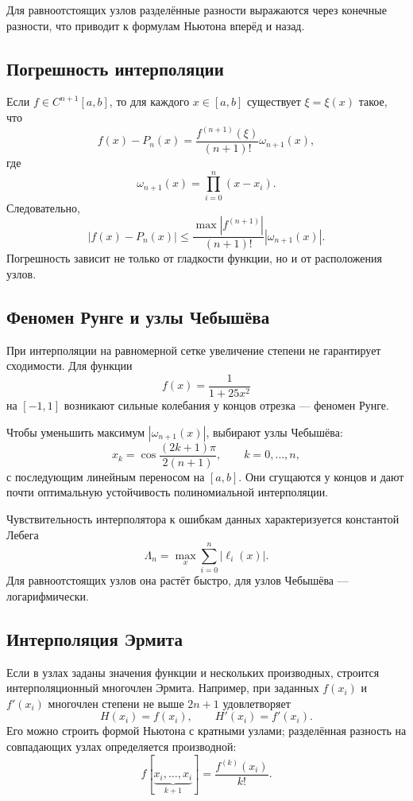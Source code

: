 Для равноотстоящих узлов разделённые разности выражаются через конечные разности,
что приводит к формулам Ньютона вперёд и назад.

\subsection{Погрешность интерполяции}

Если $f\in C^{n+1}[a,b]$, то для каждого $x\in[a,b]$ существует
$\xi=\xi(x)$ такое, что
\[
    f(x)-P_n(x)=
    \frac{f^{(n+1)}(\xi)}{(n+1)!}
    \omega_{n+1}(x),
\]
где
\[
    \omega_{n+1}(x)=\prod_{i=0}^{n}(x-x_i).
\]
Следовательно,
\[
    |f(x)-P_n(x)|
    \leq
    \frac{\max|f^{(n+1)}|}{(n+1)!}
    |\omega_{n+1}(x)|.
\]
Погрешность зависит не только от гладкости функции, но и от расположения узлов.

\subsection{Феномен Рунге и узлы Чебышёва}

При интерполяции на равномерной сетке увеличение степени не гарантирует
сходимости. Для функции
\[
    f(x)=\frac{1}{1+25x^2}
\]
на $[-1,1]$ возникают сильные колебания у концов отрезка --- феномен Рунге.

Чтобы уменьшить максимум $|\omega_{n+1}(x)|$, выбирают узлы Чебышёва:
\[
    x_k=\cos\frac{(2k+1)\pi}{2(n+1)},
    \qquad k=0,\ldots,n,
\]
с последующим линейным переносом на $[a,b]$. Они сгущаются у концов и дают почти
оптимальную устойчивость полиномиальной интерполяции.

Чувствительность интерполятора к ошибкам данных характеризуется константой
Лебега
\[
    \Lambda_n=\max_x\sum_{i=0}^{n}|\ell_i(x)|.
\]
Для равноотстоящих узлов она растёт быстро, для узлов Чебышёва --- логарифмически.

\subsection{Интерполяция Эрмита}

Если в узлах заданы значения функции и нескольких производных, строится
интерполяционный многочлен Эрмита. Например, при заданных $f(x_i)$ и $f'(x_i)$
многочлен степени не выше $2n+1$ удовлетворяет
\[
    H(x_i)=f(x_i),
    \qquad
    H'(x_i)=f'(x_i).
\]
Его можно строить формой Ньютона с кратными узлами; разделённая разность на
совпадающих узлах определяется производной:
\[
    f[\underbrace{x_i,\ldots,x_i}_{k+1}]
    =\frac{f^{(k)}(x_i)}{k!}.
\]

